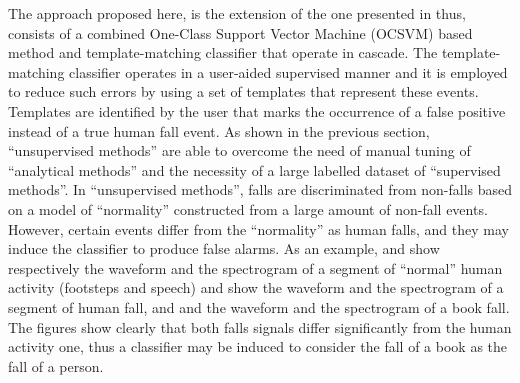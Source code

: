 The approach proposed here, is the extension of the one presented in  thus, consists of a combined One-Class Support Vector Machine (OCSVM) based method and template-matching classifier that operate in cascade. The template-matching classifier operates in a user-aided supervised manner and it is employed to reduce such errors by using a set of templates that represent these events. Templates are identified by the user that marks the occurrence of a false positive instead of a true human fall event. 
As shown in the previous section, ``unsupervised methods'' are able to overcome the need of manual tuning of ``analytical methods'' and the necessity of a large labelled dataset of ``supervised methods''. In ``unsupervised methods'', falls are discriminated from non-falls based on a model of ``normality'' constructed from a large amount of non-fall events. However, certain events differ from the ``normality'' as human falls, and they may induce the classifier to produce false alarms. As an example,  and  show respectively the waveform and the spectrogram of a segment of ``normal'' human activity (footsteps and speech)  and  show the waveform and the spectrogram of a segment of human fall, and  and  the waveform and the spectrogram of a book fall. The figures show clearly that both falls signals differ significantly from the human activity one, thus a classifier may be induced to consider the fall of a book as the fall of a person.

